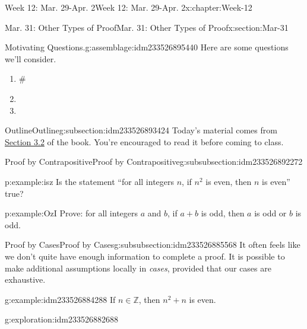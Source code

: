 \documentclass[oneside,10pt,]{book}
\numberwithin{equation}{section}
\def\Z{{\mathbb Z}}
\newcommand{\Z}{\mathbb Z}
\begin{document}
\begin{chapterptx}{Week 12: Mar. 29-Apr. 2}{}{Week 12: Mar. 29-Apr. 2}{}{}{x:chapter:Week-12}
\begin{sectionptx}{Mar. 31: Other Types of Proof}{}{Mar. 31: Other Types of Proof}{}{}{x:section:Mar-31}
\begin{introduction}{}%
\begin{assemblage}{Motivating Questions.}{g:assemblage:idm233526895440}%
Here are some questions we'll consider. %
\begin{enumerate}
\item{}\#%
\item{}%
\item{}%
\end{enumerate}
%
\end{assemblage}
\end{introduction}%
%
%
\typeout{************************************************}
\typeout{************************************************}
%
\begin{subsectionptx}{Outline}{}{Outline}{}{}{g:subsection:idm233526893424}
Today's material comes from \href{http://discrete.openmathbooks.org/dmoi3/sec_logic-proofs.html}{Section 3.2} of the book. You're encouraged to read it before coming to class.%
%
%
\typeout{************************************************}
\typeout{************************************************}
%
\begin{subsubsectionptx}{Proof by Contrapositive}{}{Proof by Contrapositive}{}{}{g:subsubsection:idm233526892272}
\begin{example}{}{p:example:isz}%
Is the statement ``for all integers \(n\), if \(n^2\) is even, then \(n\) is even'' true?%
\end{example}
\begin{example}{}{p:example:OzI}%
Prove: for all integers \(a\) and \(b\), if \(a + b\) is odd, then \(a\) is odd or \(b\) is odd.%
\end{example}
\end{subsubsectionptx}
%
%
\typeout{************************************************}
\typeout{************************************************}
%
\begin{subsubsectionptx}{Proof by Cases}{}{Proof by Cases}{}{}{g:subsubsection:idm233526885568}
It often feels like we don't quite have enough information to complete a proof. It is possible to make additional assumptions locally in \emph{cases}, provided that our cases are exhaustive.%
\begin{example}{}{g:example:idm233526884288}%
If \(n\in\Z\), then \(n^2+n\) is even.%
\end{example}
\begin{exploration}{}{g:exploration:idm233526882688}%

\end{exploration}
\end{subsubsectionptx}
\end{subsectionptx}
\end{sectionptx}
\end{chapterptx}
\end{document}
